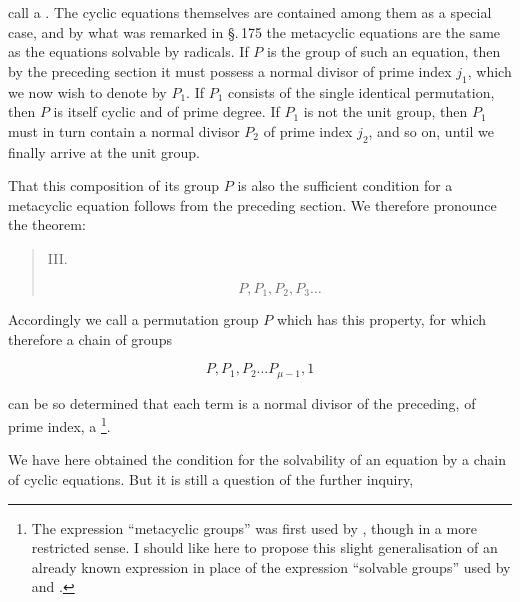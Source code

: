 call a . The cyclic equations
themselves are contained among them as a special case,
and by what was remarked in \S.\,175 the metacyclic
equations are the same as the equations solvable by radicals. If $P$ is the group of such an equation, then by
the preceding section it must possess a normal divisor of prime index $j_1$, which we now wish to denote by $P_1$.
If $P_1$ consists of the single identical permutation, then $P$
is itself cyclic and of prime degree. If $P_1$ is not the unit group, then $P_1$ must in turn contain a normal divisor $P_2$ of prime index $j_2$, and so on, until we finally arrive at the unit
group.

That this composition of its group $P$ is also the sufficient condition for a metacyclic equation follows from the preceding section. We
therefore pronounce the theorem:

\begin{quote}
\noindent III.\ 

\[
P, P_1, P_2, P_3 \ldots
\]

\end{quote}

Accordingly we call a permutation group $P$ which has this
property, for which therefore a chain of groups

\[
P, P_1, P_2 \ldots P_{\mu-1}, 1
\]

can be so determined that each term is a normal divisor of the preceding, of prime index, a \footnote{The expression ``metacyclic groups'' was first used by ,
though in a more restricted sense. I should like here to propose this
slight generalisation of an already known expression in place of the
expression ``solvable groups'' used by  and .}.

We have here obtained the condition for the  solvability of an equation by a chain of cyclic
equations. But it is still a question of the further inquiry,
